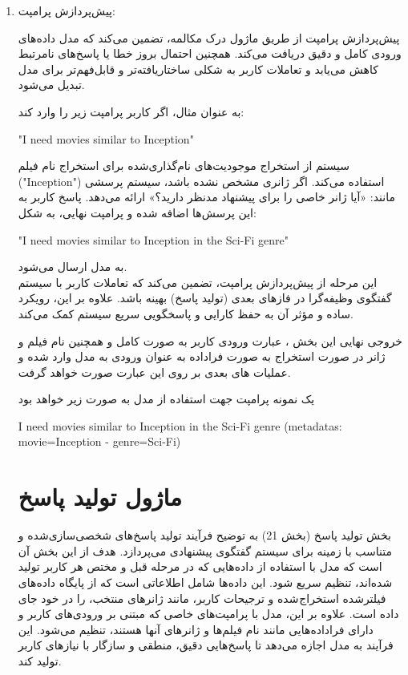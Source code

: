 \begin{enumerate}
\item

پیش‌پردازش پرامپت:

پیش‌پردازش پرامپت از طریق ماژول درک مکالمه، تضمین می‌کند که مدل داده‌های ورودی کامل و دقیق دریافت می‌کند. همچنین احتمال بروز خطا یا پاسخ‌های نامرتبط کاهش می‌یابد و  تعاملات کاربر به شکلی ساختاریافته‌تر و قابل‌فهم‌تر برای مدل تبدیل می‌شود.

به عنوان مثال، اگر کاربر پرامپت زیر را وارد کند: 
\begin{displayquote}
\begin{LTR}
"I need movies similar to Inception"
\end{LTR}
\end{displayquote}

سیستم از استخراج موجودیت‌های نام‌گذاری‌شده برای استخراج نام فیلم ("Inception") استفاده می‌کند.
اگر ژانری مشخص نشده باشد، سیستم پرسشی مانند: «آیا ژانر خاصی را برای پیشنهاد مدنظر دارید؟» ارائه می‌دهد.
پاسخ کاربر به این پرسش‌ها اضافه شده و پرامپت نهایی، به شکل: 

\begin{displayquote}
\begin{LTR}
"I need movies similar to Inception in the Sci-Fi genre"
\end{LTR}
\end{displayquote}
به مدل ارسال می‌شود.
\\
این مرحله از پیش‌پردازش پرامپت، تضمین می‌کند که تعاملات کاربر با سیستم گفتگوی وظیفه‌گرا در فازهای بعدی (تولید پاسخ) بهینه باشد. علاوه بر این، رویکرد ساده و مؤثر آن به حفظ کارایی و پاسخگویی سریع سیستم کمک می‌کند.

خروجی نهایی این بخش ، عبارت ورودی کاربر به صورت کامل و همچنین نام فیلم و ژانر در صورت استخراج به صورت فراداده به عنوان ورودی به مدل وارد شده و عملیات های بعدی بر روی این عبارت صورت خواهد گرفت.

یک نمونه پرامپت جهت استفاده از مدل به صورت زیر خواهد بود
\begin{displayquote}
\begin{LTR}
{I need movies similar to Inception in the Sci-Fi genre} (metadatas: movie={Inception} - genre={Sci-Fi})
\end{LTR}
\end{displayquote}


\section{ماژول تولید پاسخ}
بخش تولید پاسخ%
 (بخش 21) به توضیح فرآیند تولید پاسخ‌های شخصی‌سازی‌شده و متناسب با زمینه برای سیستم گفتگوی پیشنهادی می‌پردازد. هدف از این بخش آن است که مدل با استفاده از داده‌هایی که در مرحله قبل و مختص هر کاربر تولید شده‌اند، تنظیم سریع شود. این داده‌ها شامل اطلاعاتی است که از پایگاه داده‌های فیلترشده استخراج شده و ترجیحات کاربر، مانند ژانرهای منتخب، را در خود جای داده است. علاوه بر این، مدل با پرامپت‌های خاصی که مبتنی بر ورودی‌های کاربر و دارای فراداده‌هایی مانند نام فیلم‌ها و ژانرهای آنها هستند، تنظیم می‌شود. این فرآیند به مدل اجازه می‌دهد تا پاسخ‌هایی دقیق، منطقی و سازگار با نیازهای کاربر تولید کند. 



\end{enumerate}

